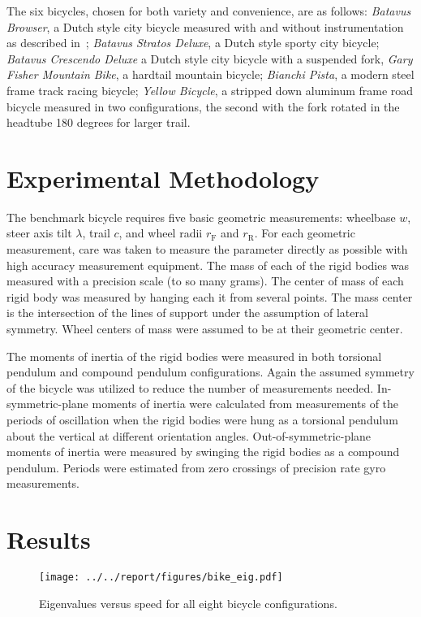 \documentclass{bmd2010a}
\begin{document}
The six bicycles, chosen for both variety and convenience, are as follows:
\emph{Batavus Browser}, a Dutch style city bicycle measured with and without
instrumentation as described in~\cite{Kooijman2009a}; \emph{Batavus Stratos
Deluxe}, a Dutch style sporty city bicycle; \emph{Batavus Crescendo Deluxe} a
Dutch style city bicycle with a suspended fork, \emph{Gary Fisher Mountain
Bike}, a hardtail mountain bicycle; \emph{Bianchi Pista}, a modern steel frame
track racing bicycle; \emph{Yellow Bicycle}, a stripped down aluminum frame
road bicycle measured in two configurations, the second with the fork rotated
in the headtube 180 degrees for larger trail.

\section*{Experimental Methodology}
The benchmark bicycle requires five basic geometric measurements: wheelbase
$w$, steer axis tilt $\lambda$, trail $c$, and wheel radii $r_\mathrm{F}$
and $r_\mathrm{R}$. For each geometric measurement, care was taken to measure
the parameter directly as possible with high accuracy measurement equipment.
The mass of each of the rigid bodies was
measured with a precision scale (to so many grams). The center of mass of each rigid
body was measured by hanging each it from several points. The mass
center is the intersection of the lines of support under the
assumption of lateral symmetry. Wheel centers of mass were assumed to be
at their geometric center.

The moments of inertia of the rigid bodies were measured in both torsional
pendulum and compound pendulum configurations. Again the assumed symmetry of the
bicycle was utilized to reduce the number of measurements needed.
In-symmetric-plane moments of inertia were calculated from measurements of the
periods of oscillation when the rigid bodies were hung as a torsional pendulum about the vertical at
different orientation angles. Out-of-symmetric-plane moments of inertia were
measured by swinging the rigid bodies as a compound pendulum. Periods were
estimated from zero crossings of precision rate gyro measurements.
\section*{Results}
\begin{figure}[htbp]
    \begin{center}
        \texttt{[image: ../../report/figures/bike\_eig.pdf]}
    \end{center}
    \caption{Eigenvalues versus speed for all eight bicycle configurations.}
    \label{fig:bike_eig}
\end{figure}
\end{document}
